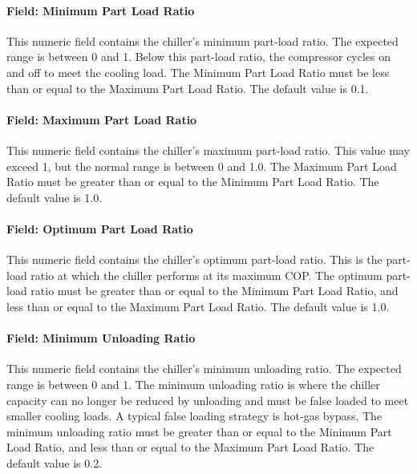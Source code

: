 \paragraph{Field: Minimum Part Load Ratio}\label{field-minimum-part-load-ratio-4}

This numeric field contains the chiller's minimum part-load ratio. The expected range is between 0 and 1. Below this part-load ratio, the compressor cycles on and off to meet the cooling load. The Minimum Part Load Ratio must be less than or equal to the Maximum Part Load Ratio. The default value is 0.1.

\paragraph{Field: Maximum Part Load Ratio}\label{field-maximum-part-load-ratio-4}

This numeric field contains the chiller's maximum part-load ratio. This value may exceed 1, but the normal range is between 0 and 1.0. The Maximum Part Load Ratio must be greater than or equal to the Minimum Part Load Ratio. The default value is 1.0.

\paragraph{Field: Optimum Part Load Ratio}\label{field-optimum-part-load-ratio-4}

This numeric field contains the chiller's optimum part-load ratio. This is the part-load ratio at which the chiller performs at its maximum COP. The optimum part-load ratio must be greater than or equal to the Minimum Part Load Ratio, and less than or equal to the Maximum Part Load Ratio. The default value is 1.0.

\paragraph{Field: Minimum Unloading Ratio}\label{field-minimum-unloading-ratio-1}

This numeric field contains the chiller's minimum unloading ratio. The expected range is between 0 and 1. The minimum unloading ratio is where the chiller capacity can no longer be reduced by unloading and must be false loaded to meet smaller cooling loads. A typical false loading strategy is hot-gas bypass. The minimum unloading ratio must be greater than or equal to the Minimum Part Load Ratio, and less than or equal to the Maximum Part Load Ratio. The default value is 0.2.

